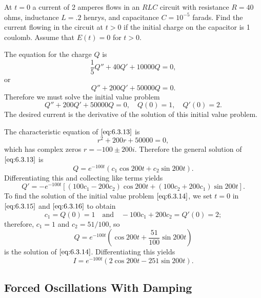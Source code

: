 \documentclass{ximera}
\begin{document}
\begin{example}\label{example:6.3.1}
At $t=0$ a current of 2 amperes flows in an $RLC$ circuit with
resistance $R=40$ ohms, inductance $L=.2$ henrys, and capacitance
$C=10^{-5}$ farads. Find the current flowing in the circuit at $t>0$
if the initial charge on the capacitor is 1 coulomb. Assume that
$E(t)=0$ for $t>0$.

\begin{explanation} The equation for the charge $Q$ is $$\frac{1}{5}Q''+40Q'+10000Q=0, $$ or
\begin{equation} \label{eq:6.3.13}
Q''+200Q'+50000Q=0.
\end{equation}
Therefore we must solve the initial value problem
\begin{equation} \label{eq:6.3.14}
Q''+200Q'+50000Q=0,\quad Q(0)=1,\quad Q'(0)=2.
\end{equation}
The desired current is the derivative of the solution of this initial value problem.

The characteristic equation of $\eqref{eq:6.3.13}$ is
$$
r^2+200r+50000=0,
$$
which has complex zeros $r=-100\pm200i$. Therefore the general
solution of $\eqref{eq:6.3.13}$ is
\begin{equation} \label{eq:6.3.15}
Q=e^{-100t}(c_1\cos200t+c_2\sin200t).
\end{equation}
Differentiating this and collecting like terms yields
\begin{equation} \label{eq:6.3.16}
Q'=-e^{-100t}\left[(100c_1-200c_2)\cos200t+
(100c_2+200c_1)\sin200t\right].
\end{equation}
To find the solution of the initial value problem $\eqref{eq:6.3.14}$,
we set $t=0$ in $\eqref{eq:6.3.15}$ and $\eqref{eq:6.3.16}$ to obtain
$$
c_1=Q(0)=1\quad\mbox{and}\quad   -100c_1+200c_2=Q'(0)=2;
$$
therefore, $c_1=1$ and $c_2=51/100$, so
$$
Q=e^{-100t}\left(\cos200t+\frac{51}{100}\sin200t\right)
$$
is the solution of $\eqref{eq:6.3.14}$.
Differentiating this yields
$$
I=e^{-100t}(2\cos200t-251\sin200t).
$$
\end{explanation}
\end{example}

\subsection*{Forced Oscillations With Damping}
\end{document}
